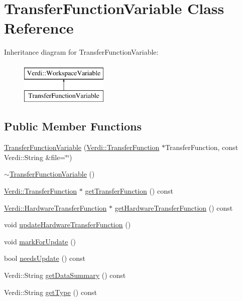 \hypertarget{class_transfer_function_variable}{\section{\-Transfer\-Function\-Variable \-Class \-Reference}
\label{class_transfer_function_variable}
}
\-Inheritance diagram for \-Transfer\-Function\-Variable\-:\begin{figure}[H]
\begin{center}
\leavevmode
\includegraphics[height=2.000000cm]{class_transfer_function_variable}
\end{center}
\end{figure}
\subsection*{\-Public \-Member \-Functions}
\begin{DoxyCompactItemize}
\item 
\hyperlink{class_transfer_function_variable_a2959818abaa3a6e861e817d5d2cb8857}{\-Transfer\-Function\-Variable} (\hyperlink{class_verdi_1_1_transfer_function}{\-Verdi\-::\-Transfer\-Function} $\ast$\-Transfer\-Function, const \-Verdi\-::\-String \&file=\char`\"{}\char`\"{})
\item 
\hyperlink{class_transfer_function_variable_aad2b7857a25059108a62f4b18b1e5253}{$\sim$\-Transfer\-Function\-Variable} ()
\item 
\hyperlink{class_verdi_1_1_transfer_function}{\-Verdi\-::\-Transfer\-Function} $\ast$ \hyperlink{class_transfer_function_variable_a0ae32fb6e727269a3225b8e398332d11}{get\-Transfer\-Function} () const 
\item 
\hyperlink{class_verdi_1_1_hardware_transfer_function}{\-Verdi\-::\-Hardware\-Transfer\-Function} $\ast$ \hyperlink{class_transfer_function_variable_a3f410e05e3d6bf175879ce3956dd9e94}{get\-Hardware\-Transfer\-Function} () const 
\item 
void \hyperlink{class_transfer_function_variable_a1a84b8c3dae1d9677701d93325b59918}{update\-Hardware\-Transfer\-Function} ()
\item 
void \hyperlink{class_transfer_function_variable_a25885d9e5d03d4c7c385751e187cf23a}{mark\-For\-Update} ()
\item 
bool \hyperlink{class_transfer_function_variable_a37b8c049074198aca2b65e04f182bc6e}{needs\-Update} () const 
\item 
\-Verdi\-::\-String \hyperlink{class_transfer_function_variable_a8f07b116ceacddf85cb439e8efe29709}{get\-Data\-Summary} () const 
\item 
\-Verdi\-::\-String \hyperlink{class_transfer_function_variable_a4ff3a101f859a0c3ffdd9947947a5eb7}{get\-Type} () const 
\end{DoxyCompactItemize}
